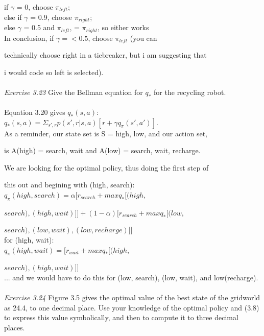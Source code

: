 \documentclass{article}
\begin{document}
if $\gamma$ = 0, choose $\pi_{left}$;\\ 

else if $\gamma$ = 0.9, choose $\pi_{right}$;\\

else $\gamma$ = 0.5 and $\pi_{left}$, = $\pi_{right}$, so either works\\

In conclusion, if $\gamma =< 0.5$, choose $\pi_{left}$ (you can 

technically choose right in a tiebreaker, but i am suggesting that 

i would code so left is selected).\\
\\
\textit{Exercise 3.23} Give the Bellman equation for $q_{*}$ for the recycling robot. \\
\\

Equation 3.20 gives $q_{*}(s, a)$: \\

$q_{*}(s, a) = \Sigma_{s', r}p(s', r|s, a)[r + \gamma q_{\pi}(s', a')]$.\\

As a reminder, our state set is S = {high, low}, and our action set, 

is A(high) = {search, wait} and A(low) = {search, wait, recharge}.

We are looking for the optimal policy, thus doing the first step of

this out and begining with (high, search):
\\

$q_\pi(high, search) = \alpha[r_{search} + maxq_{*}[(high,$

$search), (high, wait)]] + (1 - \alpha)[r_{search} + maxq_{*}[(low,$

$search), (low, wait), (low, recharge)]]$ \\

for (high, wait): \\

$q_\pi(high, wait) = [r_{wait} + maxq_{*}[(high,$

$search), (high, wait)]]$ \\

... and we would have to do this for (low, search), (low, wait), and low(recharge).\\
\\
\textit{Exercise 3.24} Figure 3.5 gives the optimal value of the best state of the gridworld as 24.4, to one decimal place. Use your knowledge of the optimal policy and (3.8) to express this value symbolically, and then to compute it to three decimal places. \\
\\
\end{document}
